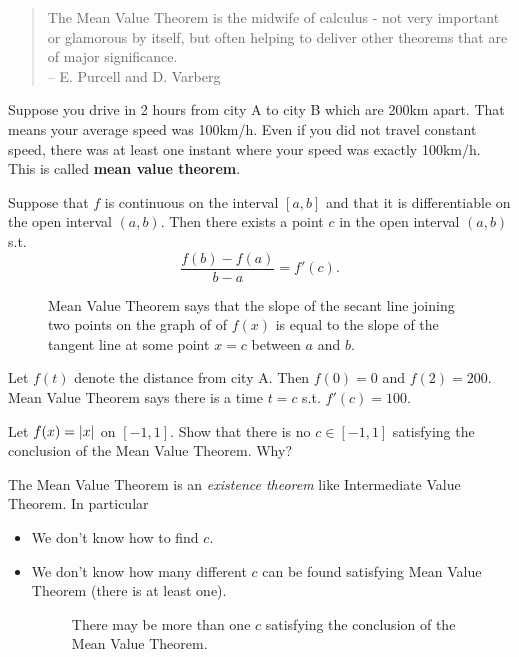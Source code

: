 \documentclass[../calc1-main.tex]{subfiles}
\begin{document}
\begin{quotation}
  The Mean Value Theorem is the midwife of calculus - not very important or glamorous by itself, but often helping to deliver other theorems that are of major significance.\\ – E. Purcell and D. Varberg
\end{quotation}

  Suppose you drive in 2 hours from city A to city B which are 200km apart. That means your average speed was 100km/h. Even if you did not travel constant speed, there was at least one instant where  your speed was exactly 100km/h. This is called \textbf{mean value theorem}.

  \begin{minipage}{0.5\textwidth}
    \begin{theorem}
      Suppose that $f$ is continuous on the interval $[a, b]$ and that it is differentiable on the open interval $(a, b)$. Then there exists a point $c$ in the open interval $(a, b)$ s.t.
      \[
        \frac{f(b) - f(a)}{b - a} = f'(c).
      \]
    \end{theorem}
  \end{minipage}%
  \begin{minipage}{0.5\textwidth}
    \begin{figure}[H]
      \centering
      
      \caption{Mean Value Theorem says that the slope of the secant line joining two points on the graph of of $f(x)$ is equal to the slope of the tangent line at some point $x=c$ between $a$ and $b$.}
    \end{figure}
  \end{minipage}

  Let $f(t)$ denote the distance from city A. Then $f(0) = 0$ and $f(2) = 200$. Mean Value Theorem says there is a time $t = c$ s.t. $f'(c) = 100$.

  \begin{example}
    Let $f(x) = \left\lvert x \right\rvert$ on $[-1, 1]$. Show that there is no $c \in [-1, 1]$ satisfying the conclusion of the Mean Value Theorem. Why?
  \end{example}

  The Mean Value Theorem is an \textit{existence theorem} like Intermediate Value Theorem. In particular
  \begin{itemize}
    \item We don't know how to find $c$.
    \item We don't know how many different $c$ can be found satisfying Mean Value Theorem (there is at least one).
    \begin{figure}[H]
      \centering
      
      \caption{There may be more than one $c$ satisfying the conclusion of the Mean Value Theorem.}
    \end{figure}
  \end{itemize}
\end{document}
